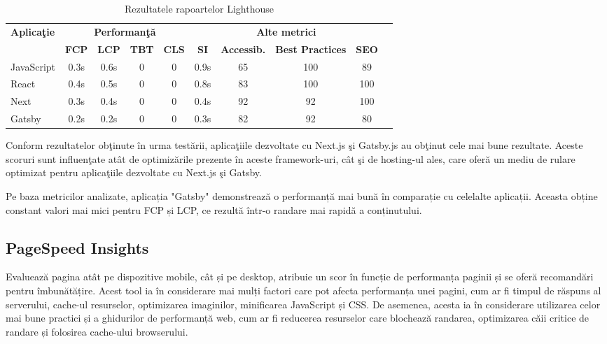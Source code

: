 \documentclass[12pt, a4paper]{report}
\begin{document}
\begin{table}[htbp]
	\centering
	\begin{tabular}{lccccccccc}
		\toprule
		\multirow{2}{*}{\textbf{Aplica\c tie}} & \multicolumn{4}{c}{\textbf{Performan\c t\u a}} & \multicolumn{4}{c}{\textbf{Alte metrici}} \\
		\cmidrule(lr){2-6} \cmidrule(l){7-9}
		& \textbf{FCP} & \textbf{LCP} & \textbf{TBT} & \textbf{CLS} & \textbf{SI} & \textbf{Accessib.} & \textbf{Best Practices} & \textbf{SEO}\\
		\midrule
		JavaScript & 0.3s & 0.6s & 0 & 0 & 0.9s & 65 & 100 & 89 \\
		React & 0.4s & 0.5s & 0 & 0 & 0.8s & 83 & 100 & 100 \\
		Next & 0.3s & 0.4s & 0 & 0 & 0.4s & 92 & 92 & 100 \\
		Gatsby & 0.2s & 0.2s & 0 & 0 & 0.3s & 82 & 92 & 80 \\
		\bottomrule
	\end{tabular}
	\caption{Rezultatele rapoartelor Lighthouse}
	\label{tab:metrics-lighthouse}
\end{table}

Conform rezultatelor ob\c tinute \^in urma test\u arii, aplica\c tiile dezvoltate cu Next.js \c si Gatsby.js au ob\c tinut cele mai bune rezultate. Aceste scoruri sunt influen\c tate at\^at de optimiz\u arile prezente \^in aceste framework-uri, c\^at \c si de hosting-ul ales, care ofer\u a un mediu de rulare optimizat pentru aplica\c tiile dezvoltate cu Next.js \c si Gatsby. 

Pe baza metricilor analizate, aplicația "Gatsby" demonstrează o performanță mai bună în comparație cu celelalte aplicații. Aceasta obține constant valori mai mici pentru FCP și LCP, ce rezult\u a \^intr-o randare mai rapidă a conținutului. 

\subsection{PageSpeed Insights}

Evaluează pagina atât pe dispozitive mobile, cât și pe desktop, atribuie un scor în funcție de performanța paginii și se oferă recomandări pentru îmbunătățire. Acest tool ia în considerare mai mulți factori care pot afecta performanța unei pagini, cum ar fi timpul de răspuns al serverului, cache-ul resurselor, optimizarea imaginilor, minificarea JavaScript și CSS. De asemenea, acesta ia în considerare utilizarea celor mai bune practici și a ghidurilor de performanță web, cum ar fi reducerea resurselor care blochează randarea, optimizarea căii critice de randare și folosirea cache-ului browserului.
\end{document}
